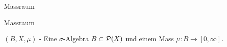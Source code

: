 \documentclass[class=article, crop=false]{standalone}
\begin{document}
\begin{zettel}{Massraum}
\begin{flashcard}[9gwsj8oy]{Massraum}

	\begin{definition}[Massraum]
		$(B, X, \mu)$ - Eine $\sigma$-Algebra $B \subset \mathcal{P}(X)$ und einem Mass $\mu : B \to [0,\infty]$.
	\end{definition}
\end{flashcard}

\end{zettel}
\end{document}

